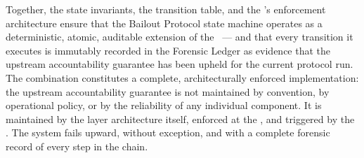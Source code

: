 Together, the state invariants, the transition table, and the \fact's enforcement architecture ensure that the Bailout Protocol state machine operates as a deterministic, atomic, auditable extension of the \fact\ --- and that every transition it executes is immutably recorded in the Forensic Ledger as evidence that the upstream accountability guarantee has been upheld for the current protocol run. The combination constitutes a complete, architecturally enforced implementation: the upstream accountability guarantee is not maintained by convention, by operational policy, or by the reliability of any individual component. It is maintained by the layer architecture itself, enforced at the \fact, and triggered by the \bounds. The system fails upward, without exception, and with a complete forensic record of every step in the chain.
